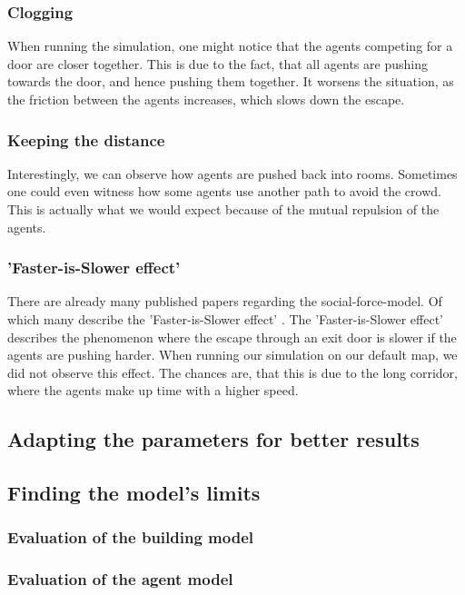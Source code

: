 \documentclass[11pt]{article}
\begin{document}
\subsubsection{Clogging}
When running the simulation, one might notice that the agents competing for a door are closer together. This is due to the fact, that all agents are pushing towards the door, and hence pushing them together. It worsens the situation, as the friction between the agents increases, which slows down the escape.  
    
\subsubsection{Keeping the distance}
Interestingly, we can observe how agents are pushed back into rooms. Sometimes one could even witness how some agents use another path to avoid the crowd. This is actually what we would expect because of the mutual repulsion of the agents. 

\subsubsection{'Faster-is-Slower effect'}
There are already many published papers regarding the social-force-model. Of which many describe the 'Faster-is-Slower effect' \cite{Helbing, Wang}. The 'Faster-is-Slower effect' describes the phenomenon where the escape through an exit door is slower if the agents are pushing harder. When running our simulation on our default map, we did not observe this effect. The chances are, that this is due to the long corridor, where the agents make up time with a higher speed.

\subsection{Adapting the parameters for better results}

\subsection{Finding the model's limits}


\subsubsection{Evaluation of the building model}
\subsubsection{Evaluation of the agent model}
\end{document}

